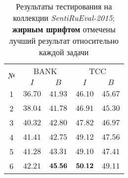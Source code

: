 \begin{table}[ht!]
\centering
\caption{Результаты тестирования на коллекции {\it SentiRuEval-2015};
   {\bf жирным шрифтом} отмечены лучший результат относительно каждой задачи
}
\label{table:results2015}
\begin{tabular}{ccccc}
\hline
\multicolumn{1}{c|}{\multirow{2}{*}{№}} & \multicolumn{2}{c|}{BANK}                                                   & \multicolumn{2}{c}{TCC}                                                  \\ \cline{2-5}
\multicolumn{1}{c|}{}                   & \multicolumn{1}{c|}{$I$} & \multicolumn{1}{c|}{$B$} & \multicolumn{1}{c|}{$I$} & \multicolumn{1}{c}{$B$} \\ \hline
1                                       & $36.70$                              & $41.93$                        & $46.10$                       & $45.67$                            \\
2                                       & $38.04$                              & $41.78$                        & $46.91$                       & $45.30$                            \\
3                                       & $40.32$                              & $42.80$                        & $47.82$                       & $46.97$                            \\
4                                       & $41.41$                              & $42.75$                        & $49.12$                       & $47.56$                            \\
5                                       & $41.28$                              & $43.31$                        & $49.10$                       & $47.41$                            \\
6                                       & $42.21$                              & ${\bf 45.56}$                  & ${\bf 50.12}$                 & $49.11$                            \\ \hline
\end{tabular}
\end{table}
